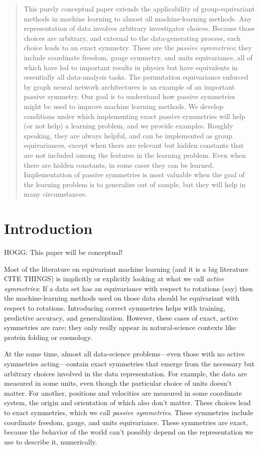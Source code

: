 \documentclass{article}
\theoremstyle{plain}
\theoremstyle{definition}
\theoremstyle{remark}
\begin{document}
\begin{abstract}
This purely conceptual paper extends the applicability of group-equivariant methods in machine learning to almost all machine-learning methods.
Any representation of data involves arbitrary investigator choices.
Because those choices are arbitrary, and external to the data-generating process, each choice leads to an exact symmetry.
These are the \emph{passive symmetries}; they include coordinate freedom, gauge symmetry, and units equivariance, all of which have led to important results in physics but have equivalents in essentially all data-analysis tasks.
The permutation equivariance enforced by graph neural network architectures is an example of an important passive symmetry.
Our goal is to understand how passive symmetries might be used to improve machine learning methods.
We develop conditions under which implementing exact passive symmetries will help (or not help) a learning problem, and we provide examples.
Roughly speaking, they are always helpful, and can be implemented as group equivariances, except when there are relevant but hidden constants that are not included among the features in the learning problem.
Even when there are hidden constants, in some cases they can be learned.
Implementation of passive symmetries is most valuable when the goal of the learning problem is to generalize out of sample, but they will help in many circumstances.
\end{abstract}

\section{Introduction}\label{sec:intro}

HOGG: This paper will be conceptual!

Most of the literature on equivariant machine learning (and it is a big literature CITE THINGS) is implicitly or explicitly looking at what we call \emph{active symmetries}:
If a data set has an equivariance with respect to rotations (say) then the machine-learning methods used on those data should be equivariant with respect to rotations.
Introducing correct symmetries helps with training, predictive accuracy, and generalization.
However, these cases of exact, active symmetries are rare; they only really appear in natural-science contexts like protein folding or cosmology.

At the same time, almost all data-science problems---even those with no active symmetries acting---contain exact symmetries that emerge from the necessary but arbitrary choices involved in the data representation.
For example, the data are measured in some units, even though the particular choice of units doesn't matter.
For another, positions and velocities are measured in some coordinate system, the origin and orientation of which also don't matter.
These choices lead to exact symmetries, which we call \emph{passive symmetries}.
These symmetries include coordinate freedom, gauge, and units equivariance.
These symmetries are exact, because the behavior of the world can't possibly depend on the representation we use to describe it, numerically.
\end{document}
